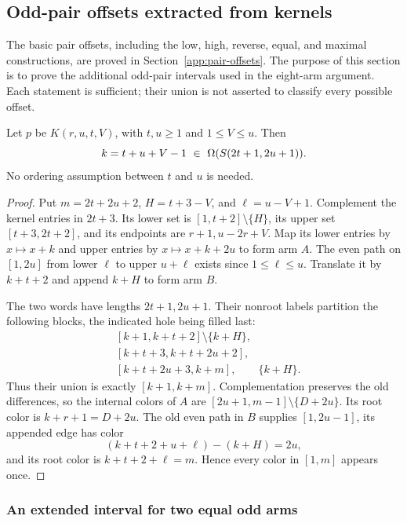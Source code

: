 \subsection{Odd-pair offsets extracted from kernels}
\label{construction:odd-pair-kernels}

The basic pair offsets, including the low, high, reverse, equal, and
maximal constructions, are proved in Section~\ref{app:pair-offsets}.
The purpose of this section is to prove the additional odd-pair
intervals used in the eight-arm argument. Each statement is sufficient;
their union is not asserted to classify every possible offset.

\begin{lemma}\label{ok:pair-extraction}
Let $p$ be $K(r,u,t,V)$, with $t,u\ge1$ and $1\le V\le u$.
Then
\[
 k=t+u+V-1\ \in\ \Om(\Sp{2t+1,2u+1}).
 \]
No ordering assumption between $t$ and $u$ is needed.
\end{lemma}
\begin{proof}
Put $m=2t+2u+2$, $H=t+3-V$, and $\ell=u-V+1$.
Complement the kernel entries in $2t+3$. Its lower set is
$[1,t+2]\setminus\{H\}$, its upper set $[t+3,2t+2]$,
and its endpoints are $r+1,u-2r+V$.
Map its lower entries by $x\mapsto x+k$ and upper entries by
$x\mapsto x+k+2u$ to form arm $A$.
The even path on $[1,2u]$ from lower $\ell$ to upper
$u+\ell$ exists since $1\le\ell\le u$.
Translate it by $k+t+2$ and append $k+H$ to form arm $B$.

The two words have lengths $2t+1,2u+1$. Their nonroot labels
partition the following blocks, the indicated hole being filled last:
\begin{align*}
 &[k+1,k+t+2]\setminus\{k+H\},\\
 &[k+t+3,k+t+2u+2],\\
 &[k+t+2u+3,k+m],\qquad\{k+H\}.
\end{align*}
Thus their union is exactly $[k+1,k+m]$.
Complementation preserves the old differences, so the internal
colors of $A$ are
$[2u+1,m-1]\setminus\{D+2u\}$.
Its root color is $k+r+1=D+2u$.
The old even path in $B$ supplies $[1,2u-1]$,
its appended edge has color
\[
 (k+t+2+u+\ell)-(k+H)=2u,
 \]
and its root color is $k+t+2+\ell=m$.
Hence every color in $[1,m]$ appears once.
\end{proof}

\subsubsection{An extended interval for two equal odd arms}


